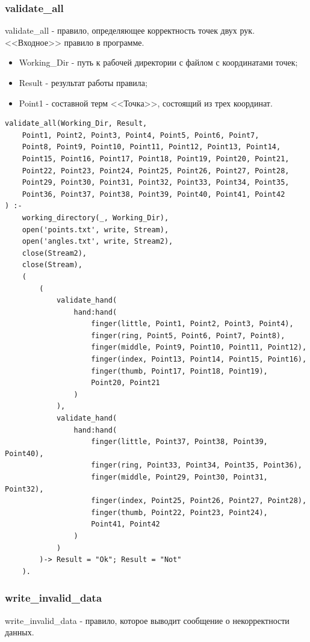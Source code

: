 \subsubsection{validate\_all}
\hspace{0.6cm} validate\_all - правило, определяющее корректность точек двух рук. <<Входное>> правило в программе.

\begin{itemize}
	\item Working\_Dir - путь к рабочей директории с файлом с координатами точек;
	\item Result - результат работы правила;
	\item Point1 - составной терм <<Точка>>, состоящий из трех координат.
\end{itemize}

\begin{lstlisting}[caption=Реализация правила validate\_all, label=rules:validateall]
validate_all(Working_Dir, Result,
	Point1, Point2, Point3, Point4, Point5, Point6, Point7,
	Point8, Point9, Point10, Point11, Point12, Point13, Point14,
	Point15, Point16, Point17, Point18, Point19, Point20, Point21,
	Point22, Point23, Point24, Point25, Point26, Point27, Point28,
	Point29, Point30, Point31, Point32, Point33, Point34, Point35,
	Point36, Point37, Point38, Point39, Point40, Point41, Point42
) :-
	working_directory(_, Working_Dir),
	open('points.txt', write, Stream),
	open('angles.txt', write, Stream2),
	close(Stream2),
	close(Stream),
	(	
		(
			validate_hand(
				hand:hand(
					finger(little, Point1, Point2, Point3, Point4),
					finger(ring, Point5, Point6, Point7, Point8),
					finger(middle, Point9, Point10, Point11, Point12),
					finger(index, Point13, Point14, Point15, Point16),
					finger(thumb, Point17, Point18, Point19),
					Point20, Point21
				)
			),
			validate_hand(
				hand:hand(
					finger(little, Point37, Point38, Point39, Point40),
					finger(ring, Point33, Point34, Point35, Point36),
					finger(middle, Point29, Point30, Point31, Point32),
					finger(index, Point25, Point26, Point27, Point28),
					finger(thumb, Point22, Point23, Point24),
					Point41, Point42
				)
			)
		)-> Result = "Ok"; Result = "Not"
	).
\end{lstlisting}

\subsubsection{write\_invalid\_data}
\hspace{0.6cm} write\_invalid\_data - правило, которое выводит сообщение о некорректности данных.

